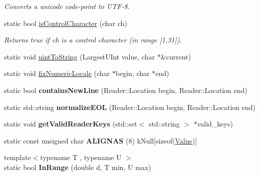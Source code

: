 \begin{DoxyCompactItemize}
\begin{DoxyCompactList}\small\item\em Converts a unicode code-\/point to U\+T\+F-\/8. \end{DoxyCompactList}\item 
\hypertarget{namespace_json_a0381e631737f51331065a388f4f59197}{}static bool \hyperlink{namespace_json_a0381e631737f51331065a388f4f59197}{is\+Control\+Character} (char ch)\label{namespace_json_a0381e631737f51331065a388f4f59197}

\begin{DoxyCompactList}\small\item\em Returns true if ch is a control character (in range \mbox{[}1,31\mbox{]}). \end{DoxyCompactList}\item 
static void \hyperlink{namespace_json_ac1ffd21a9e55122014353c773ccc496e}{uint\+To\+String} (Largest\+U\+Int value, char $\ast$\&current)
\item 
static void \hyperlink{namespace_json_aa208904144dc7b11ccc28f47c9afab9a}{fix\+Numeric\+Locale} (char $\ast$begin, char $\ast$end)
\item 
\hypertarget{namespace_json_a4d6ab0f651348832e5cc49b577a854d2}{}static bool {\bfseries contains\+New\+Line} (Reader\+::\+Location begin, Reader\+::\+Location end)\label{namespace_json_a4d6ab0f651348832e5cc49b577a854d2}

\item 
\hypertarget{namespace_json_a2e6b8616041876128cbef54b8c75da62}{}static std\+::string {\bfseries normalize\+E\+O\+L} (Reader\+::\+Location begin, Reader\+::\+Location end)\label{namespace_json_a2e6b8616041876128cbef54b8c75da62}

\item 
\hypertarget{namespace_json_a8fedd83f49c9a9109d503b2b1d4824aa}{}static void {\bfseries get\+Valid\+Reader\+Keys} (std\+::set$<$ std\+::string $>$ $\ast$valid\+\_\+keys)\label{namespace_json_a8fedd83f49c9a9109d503b2b1d4824aa}

\item 
\hypertarget{namespace_json_ad0638ab262fec34f995ca3d8a22c9cc4}{}static const unsigned char {\bfseries A\+L\+I\+G\+N\+A\+S} (8) k\+Null\mbox{[}sizeof(\hyperlink{class_json_1_1_value}{Value})\mbox{]}\label{namespace_json_ad0638ab262fec34f995ca3d8a22c9cc4}

\item 
\hypertarget{namespace_json_aff0180507262a244de61b961178d7443}{}{\footnotesize template$<$typename T , typename U $>$ }\\static bool {\bfseries In\+Range} (double d, T min, U max)\label{namespace_json_aff0180507262a244de61b961178d7443}


\end{DoxyCompactItemize}
